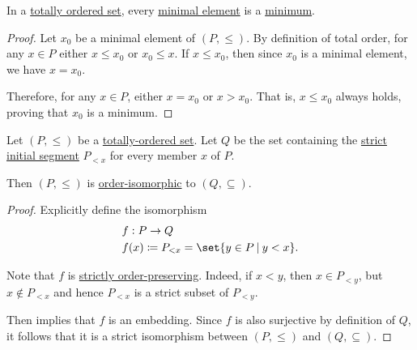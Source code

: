 \begin{proposition}\label{thm:totally_ordered_minimal_element_is_minimum}
  In a \hyperref[def:totally_ordered_set]{totally ordered set}, every \hyperref[def:extremal_points/maximal_and_minimal_element]{minimal element} is a \hyperref[def:extremal_points/maximum_and_minimum]{minimum}.
\end{proposition}
\begin{proof}
  Let \( x_0 \) be a minimal element of \( (P, \leq) \). By definition of total order, for any \( x \in P \) either \( x \leq x_0 \) or \( x_0 \leq x \). If \( x \leq x_0 \), then since \( x_0 \) is a minimal element, we have \( x = x_0 \).

  Therefore, for any \( x \in P \), either \( x = x_0 \) or \( x > x_0 \). That is, \( x \leq x_0 \) always holds, proving that \( x_0 \) is a minimum.
\end{proof}

\begin{proposition}\label{thm:totally_ordered_segment_isomorphism}
  Let \( (P, \leq) \) be a \hyperref[def:totally_ordered_set]{totally-ordered set}. Let \( Q \) be the set containing the \hyperref[def:order_interval/ray]{strict initial segment} \( P_{<x} \) for every member \( x \) of \( P \).

  Then \( (P, \leq) \) is \hyperref[def:order_homomorphism/isomorphism]{order-isomorphic} to \( (Q, \subseteq) \).
\end{proposition}
\begin{proof}
  Explicitly define the isomorphism
  \begin{equation*}
    \begin{aligned}
      &f: P \to Q \\
      &f(x) \coloneqq P_{<x} = \set{ y \in P \given y < x }.
    \end{aligned}
  \end{equation*}

  Note that \( f \) is \hyperref[def:order_homomorphism/increasing]{strictly order-preserving}. Indeed, if \( x < y \), then \( x \in P_{<y} \), but \( x \not\in P_{<x} \) and hence \( P_{<x} \) is a strict subset of \( P_{<y} \).

  Then  implies that \( f \) is an embedding. Since \( f \) is also surjective by definition of \( Q \), it follows that it is a strict isomorphism between \( (P, \leq) \) and \( (Q, \subseteq) \).
\end{proof}

